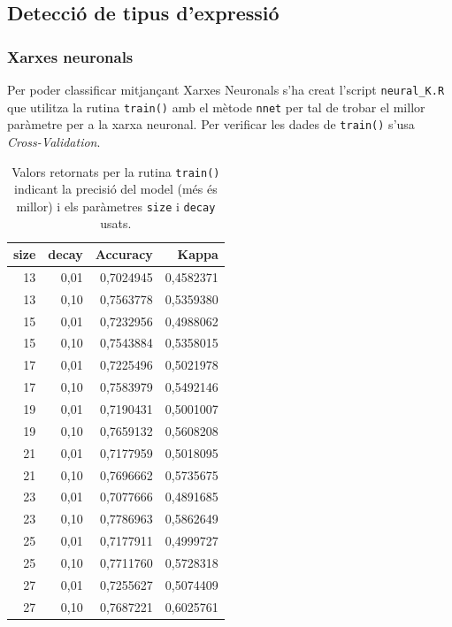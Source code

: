 \documentclass[a4paper]{article}
\begin{document}
\subsection{Detecció de tipus d'expressió}
\subsubsection{Xarxes neuronals}

Per poder classificar mitjançant Xarxes Neuronals s'ha creat l'script \verb|neural_K.R| que utilitza la rutina \verb|train()| amb el mètode \verb|nnet| per tal de trobar el millor paràmetre per a la xarxa neuronal. Per verificar les dades de \verb|train()| s'usa \emph{Cross-Validation}.

\begin{table}[H]
	\centering
	\def\arraystretch{1.2}
	\begin{tabular}{|rrrr|}
		\hline
		size & decay & Accuracy & Kappa \\
		\hline
		13 & 0,01 & 0,7024945 & 0,4582371 \\
		13 & 0,10 & 0,7563778 & 0,5359380 \\
		15 & 0,01 & 0,7232956 & 0,4988062 \\
		15 & 0,10 & 0,7543884 & 0,5358015 \\
		17 & 0,01 & 0,7225496 & 0,5021978 \\
		17 & 0,10 & 0,7583979 & 0,5492146 \\
		19 & 0,01 & 0,7190431 & 0,5001007 \\
		19 & 0,10 & 0,7659132 & 0,5608208 \\
		21 & 0,01 & 0,7177959 & 0,5018095 \\
		21 & 0,10 & 0,7696662 & 0,5735675 \\
		23 & 0,01 & 0,7077666 & 0,4891685 \\
		23 & 0,10 & 0,7786963 & 0,5862649 \\
		25 & 0,01 & 0,7177911 & 0,4999727 \\
		\rowcolor{Orange!40}
		25 & 0,10 & 0,7711760 & 0,5728318 \\
		27 & 0,01 & 0,7255627 & 0,5074409 \\
		27 & 0,10 & 0,7687221 & 0,6025761 \\
		\hline
	\end{tabular}
	\captionsetup{width=0.6\textwidth}
	\caption{Valors retornats per la rutina \texttt{train()} indicant la precisió del model (més és millor) i els paràmetres \texttt{size} i \texttt{decay} usats.}
	\label{tab:nnet_k}
\end{table}
\end{document}
